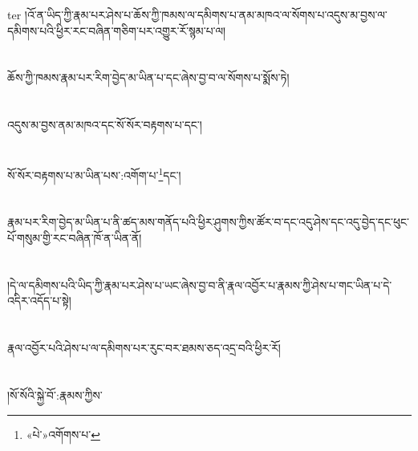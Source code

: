 ter{ }།འོ་ན་ཡིད་ཀྱི་རྣམ་པར་ཤེས་པ་ཆོས་ཀྱི་ཁམས་ལ་དམིགས་པ་ནམ་མཁའ་ལ་སོགས་པ་འདུས་མ་བྱས་ལ་དམིགས་པའི་ཕྱིར་རང་བཞིན་གཅིག་པར་འགྱུར་རོ་སྙམ་པ་ལ།\chapter{ }ཆོས་ཀྱི་ཁམས་རྣམ་པར་རིག་བྱེད་མ་ཡིན་པ་དང་ཞེས་བྱ་བ་ལ་སོགས་པ་སྨོས་ཏེ།\chapter{ }འདུས་མ་བྱས་ནམ་མཁའ་དང་སོ་སོར་བརྟགས་པ་དང་།\chapter{ }སོ་སོར་བརྟགས་པ་མ་ཡིན་པས་:འགོག་པ་\footnote{«པེ་»འགོགས་པ་}དང་།\chapter{ }རྣམ་པར་རིག་བྱེད་མ་ཡིན་པ་ནི་ཚད་མས་གནོད་པའི་ཕྱིར་ཤུགས་ཀྱིས་ཚོར་བ་དང་འདུ་ཤེས་དང་འདུ་བྱེད་དང་ཕུང་པོ་གསུམ་གྱི་རང་བཞིན་ཁོ་ན་ཡིན་ནོ།\chapter{ }།དེ་ལ་དམིགས་པའི་ཡིད་ཀྱི་རྣམ་པར་ཤེས་པ་ཡང་ཞེས་བྱ་བ་ནི་རྣལ་འབྱོར་པ་རྣམས་ཀྱི་ཤེས་པ་གང་ཡིན་པ་དེ་འདིར་འདོད་པ་སྟེ།\chapter{ }རྣལ་འབྱོར་པའི་ཤེས་པ་ལ་དམིགས་པར་རུང་བར་ཐམས་ཅད་འདྲ་བའི་ཕྱིར་རོ།\chapter{ }།སོ་སོའི་སྐྱེ་བོ་:རྣམས་ཀྱིས་\